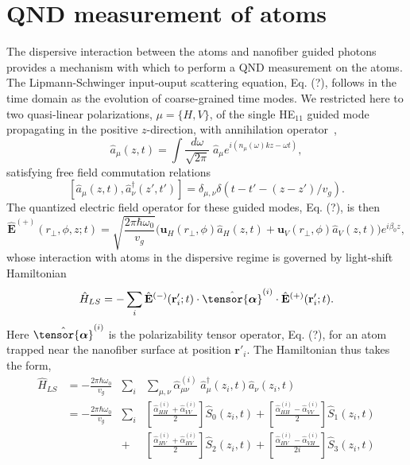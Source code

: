 \documentclass[preprint,aps,pra,onecolumn]{revtex4-1} %
\begin{document}
\section{QND measurement of atoms}
The dispersive interaction between the atoms and nanofiber guided photons provides a mechanism with which to perform a QND measurement on the atoms. The Lipmann-Schwinger input-ouput scattering equation, Eq. (?), follows in the time domain as the evolution of coarse-grained time modes.  We restricted here to two quasi-linear polarizations, $\mu =\{H,V\}$, of the single HE$_{11}$ guided mode propagating in the positive $z$-direction, with annihilation operator~\cite{},
\begin{equation}
\hat{a}_\mu(z,t) = \int \frac{d \omega}{\sqrt{2 \pi}} \; \hat{a}_\mu e^{i(n_\mu(\omega) kz-\omega t)},
\end{equation}
satisfying free field commutation relations
\begin{equation}
\left[\hat{a}_\mu(z,t),\hat{a}^\dag_\nu(z',t')\right]=\delta_{\mu,\nu}  \delta(t-t'-(z-z')/v_g).
\end{equation}
The quantized electric field operator for these guided modes, Eq. (?), is then
\begin{equation}
\hat{\mathbf{E}}^{(+)}(r\!_\perp,\phi,z;t) = \sqrt{ \frac{2 \pi \hbar \omega_0}{ v_g} } \big( \mathbf{u}_H(r\!_\perp,\phi) \hat{a}_H(z,t) + \mathbf{u}_V(r\!_\perp,\phi) \hat{a}_V(z,t) \big) e^{i \beta_0 z},
\end{equation}
whose interaction with atoms in the dispersive regime is governed by  light-shift Hamiltonian~\cite{Deutsch2010a}
\begin{equation}  
	\hat{H}_{LS}   = - \sum_i \hat{\mathbf{E}}^{(-)}(\mathbf{r}'_i ; t ) \cdot \hat{\tensor{\boldsymbol{\alpha}}}^{(i)} \cdot \hat{\mathbf{E}}^{(+)}(\mathbf{r}'_i;t ).
\end{equation}
Here $\hat{\tensor{\boldsymbol{\alpha}}}^{(i)}$ is the polarizability tensor operator, Eq. (?), for an atom trapped near the nanofiber surface at position $\mathbf{r}'_i$. The Hamiltonian thus takes the form,
\begin{align}  
	\hat{H}_{LS}   &= -\frac{2 \pi \hbar \omega_0}{v_g} &\sum_i &\sum_{\mu,\nu} \hat{\alpha}^{(i)}_{\mu \nu}\; \hat{a}_{\mu}^\dag(z_i,t)  \hat{a}_{ \nu}(z_i,t) \\
	&= -\frac{2 \pi \hbar \omega_0}{v_g} &\sum_i &  \left[\frac{\hat{\alpha}^{(i)}_{HH}+\hat{\alpha}^{(i)}_{VV}}{2} \right] \hat{S}_0(z_i,t) +  \left[\frac{\hat{\alpha}^{(i)}_{HH}-\hat{\alpha}^{(i)}_{VV}}{2} \right] \hat{S}_1(z_i,t) \nonumber \\
	&&+ &\left[\frac{\hat{\alpha}^{(i)}_{HV}+\hat{\alpha}^{(i)}_{HV}}{2} \right] \hat{S}_2(z_i,t) +  \left[\frac{\hat{\alpha}^{(i)}_{HV}-\hat{\alpha}^{(i)}_{VH}}{2i} \right] \hat{S}_3(z_i,t)  \nonumber \\
	\end{align}
\end{document}
